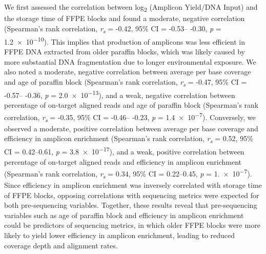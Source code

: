 \documentclass{bmcart}
\begin{document}
We first assessed the correlation between log\textsubscript{2} (Amplicon Yield/DNA Input) and the storage time of FFPE blocks and found a moderate, negative correlation (Spearman's rank correlation, \textit{r\textsubscript{s}} = -0.42, 95\% CI = -0.53-- -0.30, \textit{p} = \num{1.2e-10}). This implies that production of amplicons was less efficient in FFPE DNA extracted from older paraffin blocks, which was likely caused by more substantial DNA fragmentation due to longer environmental exposure. We also noted a moderate, negative correlation between average per base coverage and age of paraffin block (Spearman's rank correlation, \textit{r\textsubscript{s}} = -0.47, 95\% CI = -0.57-- -0.36, \textit{p} = \num{2.0e-13}), and a weak, negative correlation between percentage of on-target aligned reads and age of paraffin block (Spearman's rank correlation, \textit{r\textsubscript{s}} = -0.35, 95\% CI = -0.46-- -0.23, \textit{p} = \num{1.4e-7}). Conversely, we observed a moderate, positive correlation between average per base coverage and efficiency in amplicon enrichment (Spearman's rank correlation, \textit{r\textsubscript{s}} = 0.52, 95\% CI = 0.42--0.61, \textit{p} = \num{3.8e-17}), and a weak, positive correlation between percentage of on-target aligned reads and efficiency in amplicon enrichment (Spearman's rank correlation, \textit{r\textsubscript{s}} = 0.34, 95\% CI = 0.22--0.45, \textit{p} = \num{1.e-7}). Since efficiency in amplicon enrichment was inversely correlated with storage time of FFPE blocks, opposing correlations with sequencing metrics were expected for both pre-sequencing variables. Together, these results reveal that pre-sequencing variables such as age of paraffin block and efficiency in amplicon enrichment could be predictors of sequencing metrics, in which older FFPE blocks were more likely to yield lower efficiency in amplicon enrichment, leading to reduced coverage depth and alignment rates.
\end{document}
